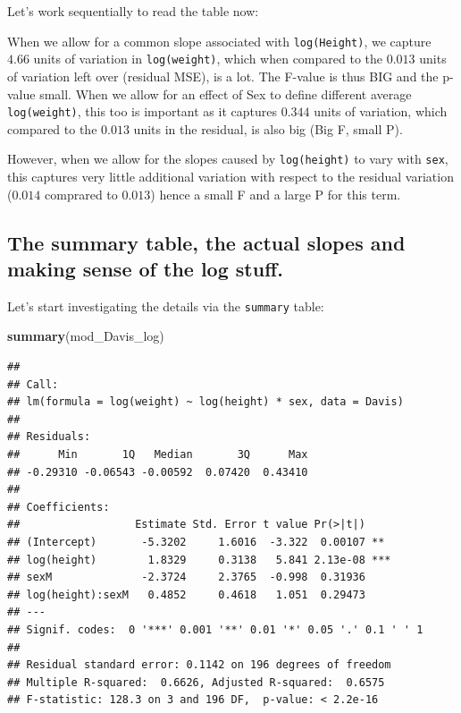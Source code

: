 \documentclass[
]{book}
\newenvironment{Shaded}{\begin{snugshade}}{\end{snugshade}}
\newcommand{\FunctionTok}[1]{\textcolor[rgb]{0.13,0.29,0.53}{\textbf{#1}}}
\newcommand{\NormalTok}[1]{#1}
\begin{document}
Let's work sequentially to read the table now:

When we allow for a common slope associated with \texttt{log(Height)}, we capture \(4.66\) units of variation in \texttt{log(weight)}, which when compared to the \(0.013\) units of variation left over (residual MSE), is a lot. The F-value is thus BIG and the p-value small. When we allow for an effect of Sex to define different average \texttt{log(weight)}, this too is important as it captures \(0.344\) units of variation, which compared to the \(0.013\) units in the residual, is also big (Big F, small P).

However, when we allow for the slopes caused by \texttt{log(height)} to vary with \texttt{sex}, this captures very little additional variation with respect to the residual variation (\(0.014\) comprared to \(0.013\)) hence a small F and a large P for this term.

\subsection{The summary table, the actual slopes and making sense of the log stuff.}\label{the-summary-table-the-actual-slopes-and-making-sense-of-the-log-stuff.}

Let's start investigating the details via the \texttt{summary} table:

\begin{Shaded}
\begin{Highlighting}[]
\FunctionTok{summary}\NormalTok{(mod\_Davis\_log)}
\end{Highlighting}
\end{Shaded}

\begin{verbatim}
## 
## Call:
## lm(formula = log(weight) ~ log(height) * sex, data = Davis)
## 
## Residuals:
##      Min       1Q   Median       3Q      Max 
## -0.29310 -0.06543 -0.00592  0.07420  0.43410 
## 
## Coefficients:
##                  Estimate Std. Error t value Pr(>|t|)    
## (Intercept)       -5.3202     1.6016  -3.322  0.00107 ** 
## log(height)        1.8329     0.3138   5.841 2.13e-08 ***
## sexM              -2.3724     2.3765  -0.998  0.31936    
## log(height):sexM   0.4852     0.4618   1.051  0.29473    
## ---
## Signif. codes:  0 '***' 0.001 '**' 0.01 '*' 0.05 '.' 0.1 ' ' 1
## 
## Residual standard error: 0.1142 on 196 degrees of freedom
## Multiple R-squared:  0.6626, Adjusted R-squared:  0.6575 
## F-statistic: 128.3 on 3 and 196 DF,  p-value: < 2.2e-16
\end{verbatim}
\end{document}
